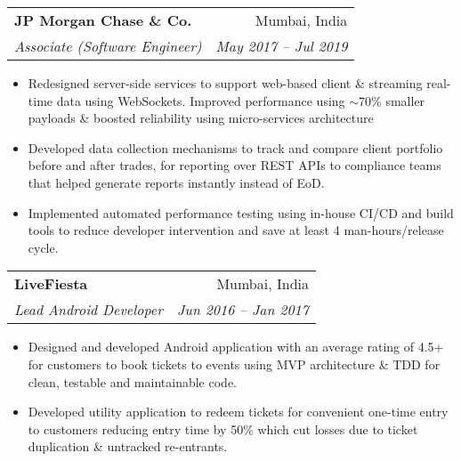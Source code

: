 \documentclass[letterpaper,11pt]{article}
\makeatletter
\newcommand{\resumeItem}[2]{
	\item\normalsize{
		\textbf{#1}{: #2}
	}\vspace{-2pt}
}
\newcommand{\resumeSubheading}[4]{
	\vspace{-2pt}\item
	\begin{tabular*}{0.97\textwidth}[t]{l@{\extracolsep{\fill}}r}
		\textbf{#1} & #2 \\
		\textit{\small#3} & \textit{\small #4} \\
	\end{tabular*}\vspace{-8pt}
}
\newcommand{\resumeSubHeadingListStart}{\begin{itemize}[leftmargin=*]}
\newcommand{\resumeSubHeadingListEnd}{\end{itemize}}
\makeatother
\begin{document}
	\resumeSubheading
	{JP Morgan Chase \& Co.}{Mumbai, India}
	{Associate (Software Engineer)}{May 2017 -- Jul 2019}
	\resumeSubHeadingListStart
	\item{Redesigned server-side services to support web-based client \& streaming real-time data using WebSockets. Improved performance using $\sim$70\% smaller payloads \& boosted reliability using micro-services architecture}
	\item{Developed data collection mechanisms to track and compare client portfolio before and after trades, for reporting over REST APIs to compliance teams that helped generate reports instantly instead of EoD.}
	\item{Implemented automated performance testing using in-house CI/CD and build tools to reduce developer intervention and save at least 4 man-hours/release cycle.}
	\vspace{-2mm}
	\resumeSubHeadingListEnd
	
	\resumeSubheading
	{LiveFiesta}{Mumbai, India}
	{Lead Android Developer}{Jun 2016 -- Jan 2017}
	\resumeSubHeadingListStart
	\item
	{Designed and developed Android application with an average rating of 4.5+ for customers to book tickets to events using MVP architecture \& TDD for clean, testable and maintainable code.} %
	\item
	{Developed utility application to redeem tickets for convenient one-time entry to customers reducing entry time by 50\% which cut losses due to ticket duplication \& untracked re-entrants.} %
	\vspace{-2mm}
	\resumeSubHeadingListEnd
	
\end{document}
